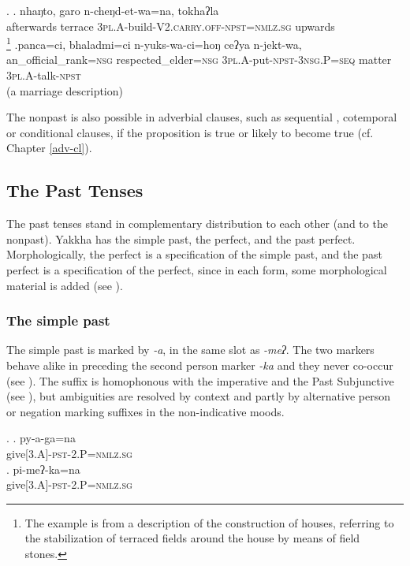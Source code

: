 \ex. \ag. nhaŋto, garo n-cheŋd-et-wa=na,      tokhaʔla\\
afterwards terrace {\scshape 3pl.A-}build{\scshape -V2.carry.off-npst=nmlz.sg} upwards\\
\footnote{The example is from a description of the  construction of houses, referring to the stabilization of terraced fields around the house by means of field stones.}  
\bg.panca=ci, bhaladmi=ci n-yuks-wa-ci=hoŋ  ceʔya n-jekt-wa,\\
an\_official\_rank{\scshape =nsg} respected\_elder{\scshape =nsg} {\scshape 3pl.A-}put{\scshape -npst-3nsg.P=seq} matter {\scshape 3pl.A-}talk{\scshape -npst}\\
 (a marriage description) 

The nonpast is also possible in adverbial  clauses, such as sequential \Last[b], cotemporal or conditional clauses, if the proposition is true or likely to become true (cf. Chapter \ref{adv-cl}). 

\subsection{The Past Tenses}\label{pst}

The past tenses stand in complementary distribution to each other (and to the nonpast). Yakkha has the simple past, the perfect, and the past perfect. Morphologically, the perfect is a specification of the simple past, and the past perfect is a specification of the perfect, since in each form, some morphological material is added (see ).

\subsubsection{The simple past}\label{sim-pst}

The simple past is marked by \emph{-a}, in the same slot as \emph{-meʔ}. The two markers behave alike in preceding the second person marker \emph{-ka} and they never co-occur (see \Next). The suffix is homophonous with the imperative and the Past Subjunctive (see ), but ambiguities are resolved by context and partly by alternative person or negation marking suffixes in the non-indicative moods.

\ex. \ag.  py-a-ga=na\\
			give{\scshape [3.A]-pst-2.P=nmlz.sg}\\
	\bg. pi-meʔ-ka=na\\ 
			give{\scshape [3.A]-pst-2.P=nmlz.sg}\\
			
